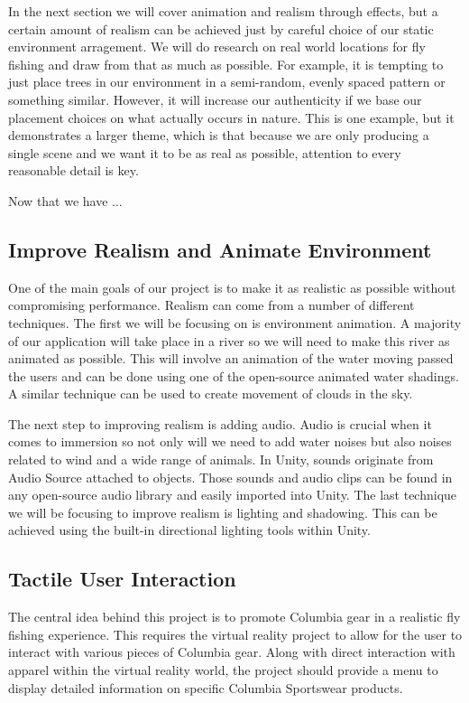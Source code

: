 \documentclass[10pt,journal,compsoc,onecolumn, draftclsnofoot]{IEEEtran}
\begin{document}
In the next section we will cover animation and realism through effects, but
a certain amount of realism can be achieved just by careful choice of our
static environment arragement. We will do research on real world locations for
fly fishing and draw from that as much as possible. For example, it is tempting
to just place trees in our environment in a semi-random, evenly spaced pattern
or something similar. However, it will increase our authenticity if we base our
placement choices on what actually occurs in nature. This is one example, but
it demonstrates a larger theme, which is that because we are only producing a
single scene and we want it to be as real as possible, attention to every
reasonable detail is key.

Now that we have ...

\subsection{Improve Realism and Animate Environment}
One of the main goals of our project is to make it as realistic as possible
without compromising performance. Realism can come from a number of different
techniques. The first we will be focusing on is environment animation. A
majority of our application will take place in a river so we will need to make
this river as animated as possible. This will involve an animation of the
water moving passed the users and can be done using one of the open-source
animated water shadings. A similar technique can be used to create movement of
clouds in the sky.

The next step to improving realism is adding audio. Audio is crucial when it
comes to immersion so not only will we need to add water noises but also noises
related to wind and a wide range of animals. In Unity, sounds originate from
Audio Source attached to objects. Those sounds and audio clips can be found in
any open-source audio library and easily imported into Unity. The last
technique we will be focusing to improve realism is lighting and shadowing.
This can be achieved using the built-in directional lighting tools within Unity.

\subsection{Tactile User Interaction}
The central idea behind this project is to promote Columbia gear in a realistic fly fishing experience. This requires the virtual reality project to allow for the user to interact with various pieces of Columbia gear. Along with direct interaction with apparel within the virtual reality world, the project should provide a menu to display detailed information on specific Columbia Sportswear products.
\end{document}
